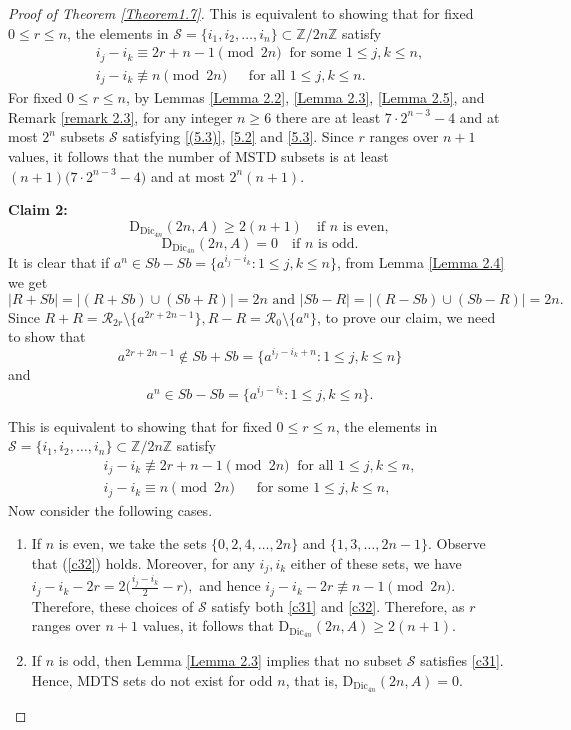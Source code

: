 \documentclass[11pt,reqno]{amsart}
\numberwithin{equation}{section}
\begin{document}
\begin{proof}[Proof of Theorem \ref{Theorem1.7}]
This is equivalent to showing that for fixed $0\leq r\leq n$, the elements in $\mathcal{S}=\{i_1,i_2,\ldots,i_n\}\subset  \mathbb{Z}/2n\mathbb{Z}$ satisfy
\begin{align}
i_j-i_k\equiv 2r+n-1\pmod{2n}~\text{ for some } 1\leq j,k\leq n, \label{5.2}\\
i_j-i_k\not\equiv n \pmod{2n}\quad ~\text{ for all } 1\leq j,k\leq n. \label{5.3}
\end{align}
For fixed $0\leq r\leq n$, by Lemmas  \ref{Lemma 2.2}, \ref{Lemma 2.3}, \ref{Lemma 2.5}, and Remark \ref{remark 2.3}, for any integer $n\ge 6$ there are at least $7\cdot 2^{n-3}-4$ and at most $2^{n}$ subsets $\mathcal{S}$ satisfying \eqref{(5.3)}, \eqref{5.2} and \eqref{5.3}. Since $r$ ranges over $n+1$ values, it follows that the number of MSTD subsets is at least $(n+1)\bigl(7\cdot 2^{n-3}-4\bigr)$ and at most $2^{n}(n+1)$.

\noindent\textbf{Claim 2:}$$\mathrm{D}_{\mathrm{Dic}_{4n}}(2n, A) \geq 2(n+1) \quad \text{if } n \text{ is even},$$
$$\mathrm{D}_{\mathrm{Dic}_{4n}}(2n, A) = 0 \quad \text{if } n \text{ is odd}.$$
It is clear that if $a^{n}\in Sb-Sb=\{a^{i_j-i_k}:1\leq j,k\leq n\}$, from Lemma \ref{Lemma 2.4} we get
$$|R+Sb|=|(R+Sb)\cup(Sb+R)|=2n \text{ and } |Sb-R|=|(R-Sb)\cup (Sb-R)|=2n.$$ Since $R+R=\mathcal{R}_{2r}\setminus\{a^{2r+2n-1}\}, R-R=\mathcal{R}_0\setminus\{a^{n}\}$, to prove our claim, we need to show that
$$ a^{2r+2n-1}\notin Sb+Sb=\{a^{i_j-i_k+n}:1\leq j,k\leq n\}$$ and $$a^{n}\in Sb-Sb=\{a^{i_j-i_k}:1\leq j,k\leq n\}.$$

This is equivalent to showing that for fixed $0\leq r\leq n$,  the elements in $\mathcal{S}=\{i_1,i_2,\ldots,i_n\}\subset  \mathbb{Z}/2n\mathbb{Z}$ satisfy
\begin{align}
i_j-i_k\not\equiv 2r+n-1\pmod{2n}~\text{ for all } 1\leq j,k\leq n, \label{c31}\\
i_j-i_k\equiv n \pmod{2n}\quad ~\text{ for some } 1\leq j,k\leq n, \label{c32}
\end{align}
 Now consider the following cases. \begin{enumerate}
    \item  If $n$ is even, we take the sets $\{0,2,4,\ldots,2n\}$ and $\{1,3,\ldots,2n-1\}$. Observe that (\ref{c32}) holds. Moreover, for any $i_j,i_k$ either of these sets, we have $i_j-i_k-2r=2\big(\frac{i_j-i_k}{2}-r\big),$ and hence $i_j-i_k-2r\not\equiv n-1 \pmod{2n}$. 
    Therefore, these choices of $\mathcal{S}$ satisfy both \eqref{c31} and \eqref{c32}. Therefore, as $r$ ranges over $n+1$ values, it follows that $ \mathrm{D}_{\mathrm{Dic}_{4n}}(2n,A)\geq 2(n+1)$. 
     \item If $n$ is odd, then  Lemma \ref{Lemma 2.3}  implies that no subset $\mathcal{S}$  satisfies \eqref{c31}. Hence, MDTS sets do not exist for odd $n$, that is, $ \mathrm{D}_{\mathrm{Dic}_{4n}}(2n,A)=0$.\end{enumerate}
    

\end{proof}
\end{document}
